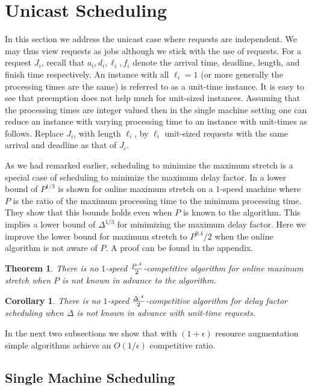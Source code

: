 \documentclass[11pt]{article}
\newtheorem{theorem}[lemma]{Theorem}
\newtheorem{corollary}[lemma]{Corollary}
\newcommand{\eps}{\epsilon}
\begin{document}
\section{Unicast Scheduling}
\label{sec:unicast}
In this section we address the unicast case where requests are
independent. We may thus view requests as jobs although we stick with
the use of requests. For a request $J_i$, recall that
$a_i,d_i,\ell_i,f_i$ denote the arrival time, deadline, length, and
finish time respectively. An instance with all $\ell_i = 1$ (or more
generally the processing times are the same) is referred to as a
unit-time instance. It is easy to see that preemption does not help
much for unit-sized instances. Assuming that the processing times are
integer valued then in the single machine setting one can reduce an
instance with varying processing time to an instance with unit-times
as follows. Replace $J_i$, with length $\ell_i$, by $\ell_i$
unit-sized requests with the same arrival and deadline as that of
$J_i$.

As we had remarked earlier, scheduling to minimize the maximum stretch
is a special case of scheduling to minimize the maximum delay factor.
In \cite{BenderCM98} a lower bound of $P^{1/3}$ is shown for online
maximum stretch on a $1$-speed machine where $P$ is the ratio of the
maximum processing time to the minimum processing time. They show that
this bounds holds even when $P$ is known to the algorithm.  This
implies a lower bound of $\Delta^{1/3}$ for minimizing the maximum delay
factor. Here we improve the lower bound for maximum stretch to
$P^{0.4}/2$ when the online algorithm is not aware of $P$. A proof
can be found in the appendix.

\begin{theorem}
  \label{thm:unicast_lb}
  There is no $1$-speed ${{P^{.4}} \over 2}$-competitive algorithm
  for online maximum stretch when $P$ is not known in advance to
  the algorithm.
\end{theorem}

\begin{corollary}
\label{delayonlylower}
There is no $1$-speed ${{\Delta^{.4}} \over 2}$-competitive algorithm
for delay factor scheduling when $\Delta$ is not known in advance with unit-time requests.
\end{corollary}

In the next two subsections we show that with $(1+\eps)$ resource
augmentation simple algorithms achieve an $O(1/\eps)$ competitive
ratio.

\subsection{Single Machine Scheduling}
\label{unicast-single}
\end{document}
